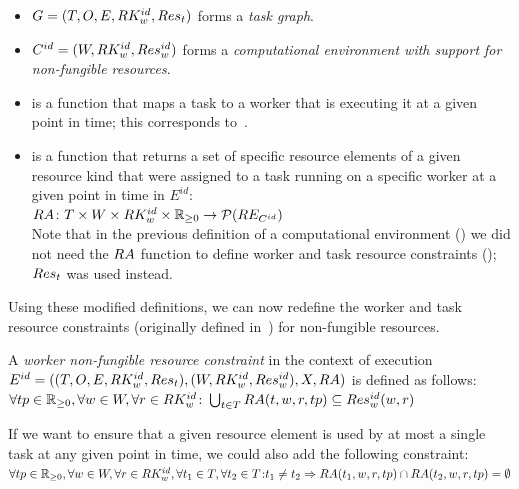 \begin{itemize}[itemsep=0pt]
	\item $G = (T, O, E, RK_w^{id}, Res_t)$ forms a \emph{task graph}.
	\item $C^{id} = (W, RK_w^{id}, Res_w^{id})$ forms a
	\emph{computational environment with support for non-fungible resources}.
	\item \fntaskworkerassigned{} is a function that maps a task to a worker that is executing it
	at a given point in time; this corresponds to~.
	\item \fntaskresassigned{} is a function that returns a set of specific resource elements of a
	      given resource kind that were assigned to a task running on a specific worker at a given point in
	      time in $E^{id}$: \\ $RA\colon T \times W \times RK_w^{id} \times \mathbb{R}_{\geq{}0} \rightarrow
		      \mathcal{P}(RE_{C^{id}})$ \vspace{2mm}\\ Note that in the
	      previous definition of a computational environment () we did not
		  need the $RA$ function to define worker and task resource constraints
		  (); $Res_t$ was used instead.
\end{itemize}

Using these modified definitions, we can now redefine the
worker and task resource constraints (originally defined
in~) for non-fungible
resources.

\vspace{2mm} A
\emph{worker non-fungible resource constraint} in the context of execution $E^{id} = ((T, O, E, RK_w^{id}, Res_t), (W, RK_w^{id}, Res_w^{id}), X,
RA)$ is
defined as follows: \vspace{1mm}\\ $\forall tp\in\mathbb{R}_{\geq{}0}, \forall w\in{}W, \forall
	r\in{}RK_w^{id}\colon \bigcup_{t\in{}T}
	RA(t, w, r, tp) \subseteq Res_w^{id}(w, r)$

\vspace{2mm}If we want to ensure that a given resource element is used by at most a
single task at any given
point in time, we could also add the following constraint: \vspace{2mm}\\
$\forall tp\in\mathbb{R}_{\geq{}0}, \forall w\in{}W, \forall
	r\in{}RK_w^{id}, \forall t_1\in{}T, \forall
	t_2\in{}T\colon \\t_1 \neq t_2 \Rightarrow RA(t_1, w, r, tp) \cap
	RA(t_2, w, r, tp) = \emptyset$ \\

